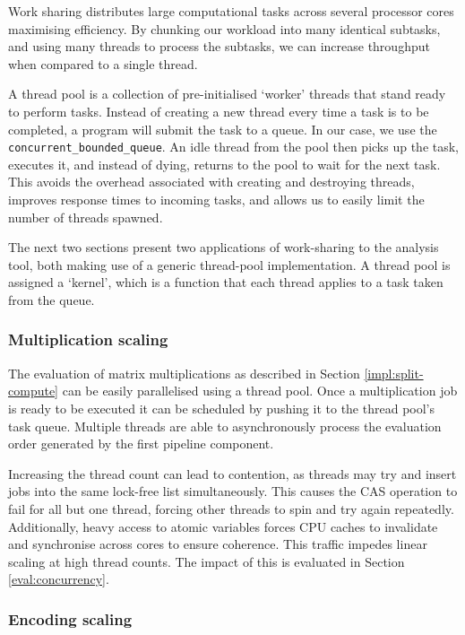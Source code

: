 Work sharing distributes large computational tasks across several processor cores maximising efficiency. By chunking
our workload into many identical subtasks, and using many threads to process the subtasks, we can increase throughput
when compared to a single thread.

A thread pool is a collection of pre-initialised `worker' threads that stand ready to perform tasks. Instead of creating 
a new thread every time a task is to be completed, a program will submit the task to a queue. In our case, we use the 
\verb|concurrent_bounded_queue|. An idle thread from the pool then picks up the task, executes it, and instead of dying,
returns to the pool to wait for the next task. This avoids the overhead associated with creating and destroying threads,
improves response times to incoming tasks, and allows us to easily limit the number of threads spawned.

The next two sections present two applications of work-sharing to the analysis tool, both making use of a generic
thread-pool implementation. A thread pool is assigned a `kernel', which is a function that each thread applies to a
task taken from the queue.

\subsubsection{Multiplication scaling}

The evaluation of matrix multiplications as described in Section \ref{impl:split-compute}
can be easily parallelised using a thread pool. Once a multiplication job is ready to be executed it can be scheduled by 
pushing it to the thread pool's task queue. Multiple threads are able to asynchronously process the evaluation order
generated by the first pipeline component.

Increasing the thread count can lead to contention, as threads may try and insert jobs into the same lock-free list 
simultaneously. This causes the CAS operation to fail for all but one thread, forcing other threads to spin and try 
again repeatedly. Additionally, heavy access to atomic variables forces CPU caches to invalidate and synchronise across 
cores to ensure coherence. This traffic impedes linear scaling at high thread counts.
The impact of this is evaluated in Section \ref{eval:concurrency}.

\subsubsection{Encoding scaling} 

